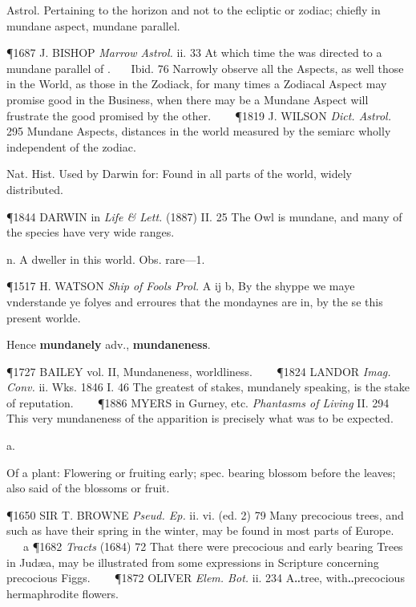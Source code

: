 \begin{description}[wide, labelwidth=!, labelindent=0pt]
\begin{myenumerate}
 Astrol. Pertaining to the horizon and not to the ecliptic or zodiac; chiefly in mundane aspect, mundane parallel.

\P 1687 J. BISHOP  \textit{Marrow Astrol.} ii. 33 At which time the  was directed to a mundane parallel of .    Ibid. 76 Narrowly observe all the Aspects, as well those in the World, as those in the Zodiack, for many times a Zodiacal Aspect may promise good in the Business, when there may be a Mundane Aspect will frustrate the good promised by the other.    
\P 1819 J. WILSON  \textit{Dict. Astrol.} 295 Mundane Aspects, distances in the world measured by the semiarc wholly independent of the zodiac.

 Nat. Hist. Used by Darwin for: Found in all parts of the world, widely distributed.

\P 1844 DARWIN in  \textit{Life \& Lett.} (1887) II. 25 The Owl is mundane, and many of the species have very wide ranges.

 n. A dweller in this world. Obs. rare—1.

\P 1517 H. WATSON  \textit{Ship of Fools Prol.} A ij b, By the shyppe we maye vnderstande ye folyes and erroures that the mondaynes are in, by the se this present worlde.

\noindent Hence \textbf{mundanely} adv., \textbf{mundaneness}.

\P 1727 BAILEY  vol. II, Mundaneness, worldliness.    
\P 1824 LANDOR  \textit{Imag. Conv.} ii. Wks. 1846 I. 46 The  greatest of stakes, mundanely speaking, is the stake of reputation.    
\P 1886 MYERS in  Gurney, etc. \textit{Phantasms of Living} II. 294 This very mundaneness of the apparition is precisely what was to be expected.




\end{myenumerate}

 a.

\noindent {}

\vspace{-0.3cm}

\begin{myenumerate}

 Of a plant: Flowering or fruiting early; spec. bearing blossom before the leaves; also said of the blossoms or fruit.

\P 1650 SIR T. BROWNE  \textit{Pseud. Ep.} ii. vi. (ed. 2) 79 Many precocious trees, and such as have their spring in the winter, may be found in most parts of Europe.    a 
\P 1682 \textit{Tracts} (1684) 72 That there were precocious and early bearing Trees in Judæa, may be illustrated from some expressions in Scripture concerning precocious Figgs.    
\P 1872 OLIVER  \textit{Elem. Bot.} ii. 234 A‥tree, with‥precocious hermaphrodite flowers.


\end{myenumerate}
\end{description}
